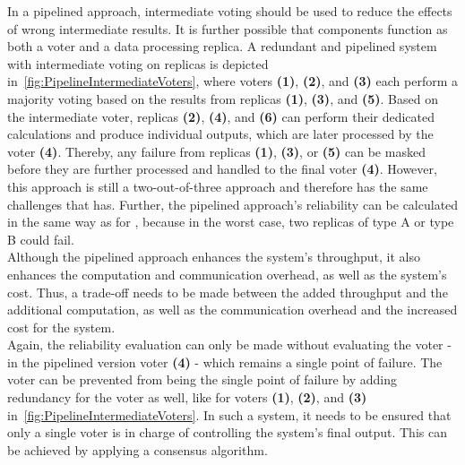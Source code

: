 In a pipelined approach, intermediate voting should be used to reduce the effects of wrong intermediate results.
It is further possible that components function as both a voter and a data processing replica.
A redundant and pipelined system with intermediate voting on replicas is depicted in~\autoref{fig:PipelineIntermediateVoters}, where voters \textbf{(1)}, \textbf{(2)}, and \textbf{(3)} each perform a majority voting based on the results from replicas \textbf{(1)}, \textbf{(3)}, and \textbf{(5)}.
Based on the intermediate voter, replicas \textbf{(2)}, \textbf{(4)}, and \textbf{(6)} can perform their dedicated calculations and produce individual outputs, which are later processed by the voter \textbf{(4)}.
Thereby, any failure from replicas \textbf{(1)}, \textbf{(3)}, or \textbf{(5)} can be masked before they are further processed and handled to the final voter \textbf{(4)}.
However, this approach is still a two-out-of-three approach and therefore has the same challenges that  has.
Further, the pipelined approach's reliability can be calculated in the same way as for , because in the worst case, two replicas of type A or type B could fail.
\\

Although the pipelined approach enhances the system's throughput, it also enhances the computation and communication overhead, as well as the system's cost.
Thus, a trade-off needs to be made between the added throughput and the additional computation,  as well as the communication overhead and the increased cost for the system.
\\

Again, the reliability evaluation can only be made without evaluating the voter - in the pipelined version voter \textbf{(4)} - which remains a single point of failure.
The voter can be prevented from being the single point of failure by adding redundancy for the voter as well, like for voters \textbf{(1)}, \textbf{(2)}, and \textbf{(3)} in~\autoref{fig:PipelineIntermediateVoters}.
In such a system, it needs to be ensured that only a single voter is in charge of controlling the system's final output.
This can be achieved by applying a consensus algorithm.

